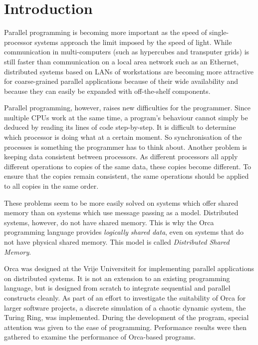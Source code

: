 \section{Introduction}
\label{sIntroduction}

\begin{sloppypar}
Parallel programming is becoming more important as the speed of
single-processor
systems approach the limit imposed by the speed of light. While
communication in multi-computers (such as hypercubes and transputer
grids) is still faster than communication on a local area network such
as an Ethernet, distributed
systems based on LANs of workstations are becoming more attractive for
coarse-grained parallel applications because of their wide availability
and because they can easily be expanded with off-the-shelf components.
\end{sloppypar}

Parallel programming, however, raises new difficulties for the
programmer. Since multiple CPUs work at the same time, a program's
behaviour cannot simply be deduced by reading its lines of code
step-by-step. It is difficult to determine which processor is doing
what at a certain moment. So synchronisation of the
processes is something the programmer has to think about. Another
problem is keeping data consistent between processors. As different
processors all apply different operations to copies of the same data,
these copies become different. To ensure that the copies remain consistent,
the same operations should be applied to all copies in the same
order.

These problems seem to be more easily solved on systems which offer
shared memory than on systems which use message passing as a model.
Distributed systems, however, do not have shared memory. This is why the
Orca programming language \cite{tse92,bal} provides
{\em logically shared data}, even on
systems that do not have physical shared memory. This model is called
{\em Distributed Shared Memory}.

Orca was designed at the Vrije Universiteit for implementing parallel
applications on distributed systems. It is not an extension to an
existing programming language, but is designed from scratch to integrate
sequential and parallel constructs cleanly. As part of an effort to
investigate the suitability of Orca for larger software projects, a
discrete simulation of a chaotic dynamic system, the Turing
Ring, was implemented. During the development of the program, special
attention was given to the ease of programming. Performance results
were then gathered to examine the performance of Orca-based programs.


